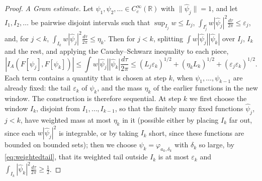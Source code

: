 \documentclass[11pt]{amsart}
\theoremstyle{definition}
\theoremstyle{remark}
\newcommand{\R}{\mathbb R}
\begin{document}
\begin{proof}
\emph{A Gram estimate.}  Let $\psi_1,\psi_2,\dots\in C_c^{\infty}(\R)$ with
$\lVert\widehat\psi_j\rVert=1$, and let $I_1,I_2,\dots$ be pairwise disjoint
intervals such that $\sup_{I_j}w\le L_j$,
$\int_{I_j^{c}}w|\widehat\psi_j|^{2}\frac{d\tau}{2\pi}\le\varepsilon_j$, and,
for $j<k$, $\int_{I_k}w|\widehat\psi_j|^{2}\frac{d\tau}{2\pi}\le\eta_k$.  Then
for $j<k$, splitting $\int w|\widehat\psi_j||\widehat\psi_k|$ over $I_j$,
$I_k$ and the rest, and applying the Cauchy--Schwarz inequality to each piece,
\begin{equation}\label{eq:gram}
|I_A(F[\psi_j],F[\psi_k])|\le\int w|\widehat\psi_j||\widehat\psi_k|
\frac{d\tau}{2\pi}\le(L_j\varepsilon_k)^{1/2}+(\eta_kL_k)^{1/2}
+(\varepsilon_j\varepsilon_k)^{1/2}.
\end{equation}
Each term contains a quantity that is chosen at step $k$, when
$\psi_1,\dots,\psi_{k-1}$ are already fixed: the tail $\varepsilon_k$ of
$\psi_k$, and the mass $\eta_k$ of the earlier functions in the new window.
The construction is therefore sequential.  At step $k$ we first choose the
window $I_k$, disjoint from $I_1,\dots,I_{k-1}$, so that the finitely many
fixed functions $\widehat\psi_j$, $j<k$, have weighted mass at most $\eta_k$
in it (possible either by placing $I_k$ far out, since each
$w|\widehat\psi_j|^{2}$ is integrable, or by taking $I_k$ short, since these
functions are bounded on bounded sets); then we choose
$\psi_k=\varphi_{a_k,\delta_k}$ with $\delta_k$ so large, by
\eqref{eq:weightedtail}, that its weighted tail outside $I_k$ is at most
$\varepsilon_k$ and $\int_{I_k}|\widehat\psi_k|^{2}\frac{d\tau}{2\pi}\ge\tfrac12$.


\end{proof}
\end{document}
